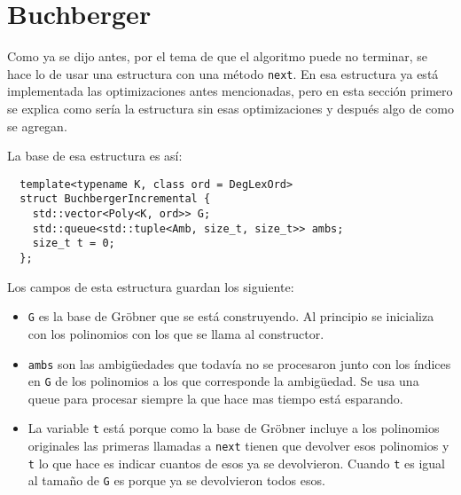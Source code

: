 \documentclass{report}
\theoremstyle{customstyle}
\theoremstyle{factstyle}
\begin{document}
\section{Buchberger}

Como ya se dijo antes, por el tema de que el algoritmo puede no terminar, se hace lo de usar una estructura con una método \texttt{next}. En esa estructura ya está implementada las optimizaciones antes mencionadas, pero en esta sección primero se explica como sería la estructura sin esas optimizaciones y después algo de como se agregan.

La base de esa estructura es así:

\begin{verbatim}
  template<typename K, class ord = DegLexOrd>
  struct BuchbergerIncremental {
    std::vector<Poly<K, ord>> G;
    std::queue<std::tuple<Amb, size_t, size_t>> ambs;
    size_t t = 0;
  };
\end{verbatim}

Los campos de esta estructura guardan los siguiente:

\begin{itemize}
  \item \texttt{G} es la base de Gröbner que se está construyendo. Al principio se inicializa con los polinomios con los que se llama al constructor.
  \item \texttt{ambs} son las ambigüedades que todavía no se procesaron junto con los índices en \texttt{G} de los polinomios a los que corresponde la ambigüedad. Se usa una queue para procesar siempre la que hace mas tiempo está esparando.
  \item La variable \texttt{t} está porque como la base de Gröbner incluye a los polinomios originales las primeras llamadas a \texttt{next} tienen que devolver esos polinomios y \texttt{t} lo que hace es indicar cuantos de esos ya se devolvieron. Cuando \texttt{t} es igual al tamaño de \texttt{G} es porque ya se devolvieron todos esos.
\end{itemize}

\end{document}
